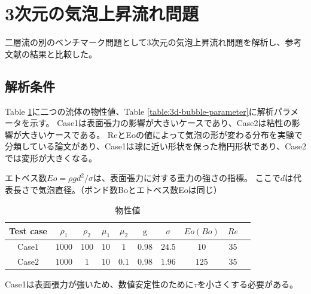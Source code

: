 \newpage
\section{3次元の気泡上昇流れ問題}

二層流の別のベンチマーク問題として3次元の気泡上昇流れ問題を解析し、参考文献の結果と比較した。

\subsection{解析条件}

Table \ref{table:3d-bubble-material-property}に二つの流体の物性値、Table \ref{table:3d-bubble-parameter}に解析パラメータを示す。
Case1は表面張力の影響が大きいケースであり、Case2は粘性の影響が大きいケースである。
ReとEoの値によって気泡の形が変わる分布を実験で分類している論文があり、Case1は球に近い形状を保った楕円形状であり、Case2では変形が大きくなる。

エトベス数$Eo = \rho g d^2 / \sigma$は、表面張力に対する重力の強さの指標。
ここで$d$は代表長さで気泡直径。（ボンド数Boとエトベス数Eoは同じ）



\renewcommand{\arraystretch}{1}
\begin{table}[H]
	\centering
	\caption{物性値}
	\begin{tabular}{cccccccccc}
		\hline
		Test case & $\rho_1$ & $\rho_2$ & $\mu_1$ & $\mu_2$ & $\mathrm{g}$ & $\sigma$ & $Eo (Bo)$ & $Re$ \\
		\hline 
		Case$1$ & $1000$ & $100$ & $10$ & $1$   & $0.98$ & $24.5$ & $10$ & $35$\\
		Case$2$ & $1000$ & $1$   & $10$ & $0.1$ & $0.98$ & $1.96$ & $125$ & $35$\\ 
		\hline         
	\end{tabular}
	\label{table:3d-bubble-material-property}
\end{table}
\renewcommand{\arraystretch}{1.0}

Case1は表面張力が強いため、数値安定性のために$\tau$を小さくする必要がある。\cite{Yamaguchi2018}

